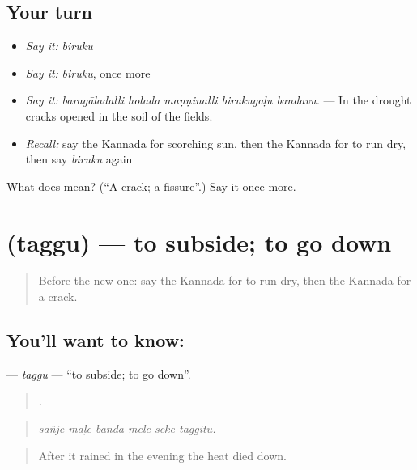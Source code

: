 \subsection*{Your turn}
\begin{itemize}
\raggedright
  \item \emph{Say it:} \emph{biruku}
  \item \emph{Say it:} \emph{biruku}, once more
  \item \emph{Say it:} \emph{baragāladalli holada maṇṇinalli birukugaḷu bandavu.} — In the drought cracks opened in the soil of the fields.
  \item \emph{Recall:} say the Kannada for scorching sun, then the Kannada for to run dry, then say \emph{biruku} again
\end{itemize}

\begin{tcolorbox}[breakable,colback=teal!4,colframe=teal!35!black,title={Before you move on}]
What does  mean? (\textquotedblleft{}A crack; a fissure\textquotedblright{}.) Say it once more.
\end{tcolorbox}
\section[\texorpdfstring{\kn{ತಗ್ಗು} (taggu)}{ತಗ್ಗು (taggu)}]{ (taggu) — to subside; to go down}

\label{lesson:KA-C488-taggu}



\begin{quote}
Before the new one: say the Kannada for to run dry, then the Kannada for a crack.
\end{quote}

\subsection*{You'll want to know: }
\textbf{} — \emph{taggu} — \textquotedblleft{}to subside; to go down\textquotedblright{}.

\begin{quote}
     .
\end{quote}

\begin{quote}
\emph{sañje maḷe banda mēle seke taggitu.}
\end{quote}

\begin{quote}
After it rained in the evening the heat died down.
\end{quote}

